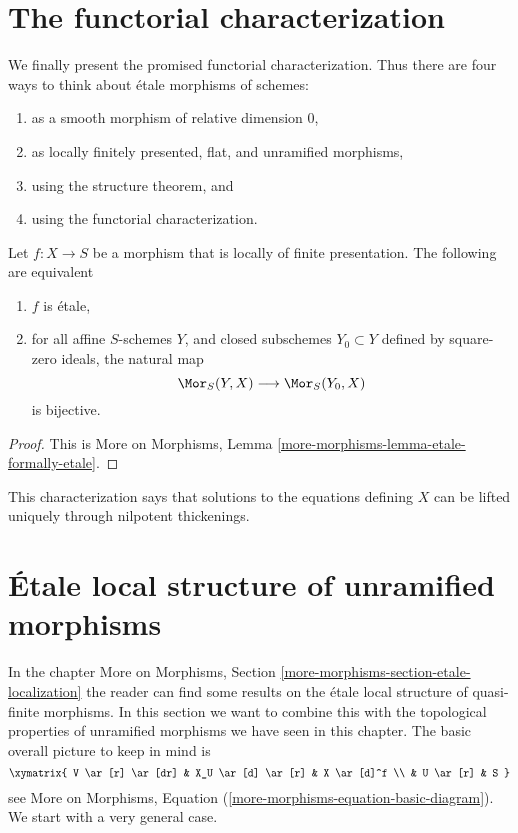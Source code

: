 \section{The functorial characterization}
\label{section-functorial-etale}

\noindent
We finally present the promised functorial characterization.
Thus there are four ways to think about \'etale morphisms of schemes:
\begin{enumerate}
\item as a smooth morphism of relative dimension $0$,
\item as locally finitely presented, flat, and unramified morphisms,
\item using the structure theorem, and
\item using the functorial characterization.
\end{enumerate}

\begin{theorem}
\label{theorem-formally-etale}
Let $f : X \to S$ be a morphism that is locally of finite presentation.
The following are equivalent
\begin{enumerate}
\item $f$ is \'etale,
\item for all affine $S$-schemes $Y$, and closed subschemes $Y_0 \subset Y$
defined by square-zero ideals, the natural map
$$
\Mor_S(Y, X) \longrightarrow \Mor_S(Y_0, X)
$$
is bijective.
\end{enumerate}
\end{theorem}

\begin{proof}
This is
More on Morphisms, Lemma \ref{more-morphisms-lemma-etale-formally-etale}.
\end{proof}

\noindent
This characterization says that solutions to the equations defining $X$ can
be lifted uniquely through nilpotent thickenings.



\section{\'Etale local structure of unramified morphisms}
\label{section-unramified-etale-local}

\noindent
In the chapter
More on Morphisms, Section \ref{more-morphisms-section-etale-localization}
the reader can find some results on the \'etale local structure of
quasi-finite morphisms. In this section we want to combine this
with the topological properties of unramified morphisms we have seen
in this chapter. The basic overall picture to keep in mind is
$$
\xymatrix{
V \ar[r] \ar[dr] & X_U \ar[d] \ar[r] & X \ar[d]^f \\
& U \ar[r] & S
}
$$
see
More on Morphisms, Equation (\ref{more-morphisms-equation-basic-diagram}).
We start with a very general case.

